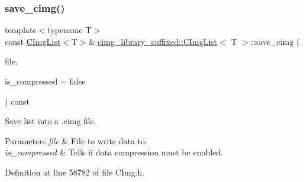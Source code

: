 \subsubsection{\texorpdfstring{save\+\_\+cimg()}{save\_cimg()}\hspace{0.1cm}{\footnotesize\ttfamily [2/4]}}
{\footnotesize\ttfamily template$<$typename T$>$ \\
const \hyperlink{structcimg__library__suffixed_1_1CImgList}{C\+Img\+List}$<$T$>$\& \hyperlink{structcimg__library__suffixed_1_1CImgList}{cimg\+\_\+library\+\_\+suffixed\+::\+C\+Img\+List}$<$ T $>$\+::save\+\_\+cimg (\begin{DoxyParamCaption}\item[{std\+::\+F\+I\+LE $\ast$}]{file,  }\item[{const bool}]{is\+\_\+compressed = {\ttfamily false} }\end{DoxyParamCaption}) const\hspace{0.3cm}{\ttfamily [inline]}}



Save list into a .cimg file. 


\begin{DoxyParams}{Parameters}
{\em file} & File to write data to. \\
\hline
{\em is\+\_\+compressed} & Tells if data compression must be enabled. \\
\hline
\end{DoxyParams}


Definition at line 58782 of file C\+Img.\+h.

\mbox{\label{structcimg__library__suffixed_1_1CImgList_aa43477599690ded555be8b24d3043a2c}} 
